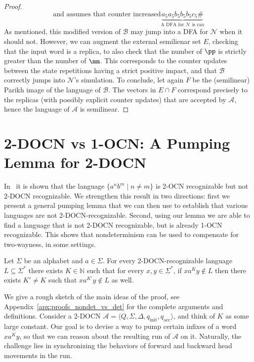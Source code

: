 \documentclass[USenglish]{lipics-v2021}
\newcommand{\tup}[1]{\langle #1 \rangle}
\newcommand{\initstate}{q_{\mathrm{init}}}
\newcommand{\accstate}{q_{\mathrm{acc}}}
\newcommand{\bbN}{\mathbb{N}}
\newcommand{\cA}{\mathcal{A}}
\newcommand{\cB}{\mathcal{B}}
\newcommand{\cN}{\mathcal{N}}
\begin{document}
\begin{proof}
\[{		\text{and assumes that counter increased}}
	\underbrace{a_5a_5b_5b_5b_5c_5 \#}_{\text{A DFA for $\cN$ is ran}}\]
	As mentioned, this modified version of \(\cB\) may jump into a DFA for \(\cN\)
	when it should not.  However, we can augment the external semilienar set \(E\), checking that the input word is a replica, to also check that %
	the number of \(\pp\) is strictly greater than the number of \(\mm\).  This
	corresponds to the counter updates between the state repetitions having a
	strict positive impact, and that \(\cB\) correctly jumps into \(\cN\)'s
	simulation.  
	To conclude, let again \(F\) be the (semilinear) Parikh image of
	the language of \(\cB\).  The vectors in \(E \cap F\) correspond precisely to the
	replicas (with possibly explicit counter updates) that are accepted by \(\cA\),
	hence the language of \(\cA\) is semilinear.
\end{proof}

\section{2-DOCN  vs 1-OCN: A Pumping Lemma for  2-DOCN}
\label{sec:nondet_vs_det}
In~\cite{chan1987two} it is shown that the language $\{a^nb^m\mid n\neq m\}$ is 2-OCN
recognizable but not 2-DOCN recognizable. We strengthen this result in two
directions: first we present a general pumping lemma that we can then use to
establish that various languages are not 2-DOCN-recognizable. Second, using our
lemma we are able to find a language that is not 2-DOCN recognizable, but is
already 1-OCN recognizable. This shows that nondeterminism can be used to
compensate for two-wayness, in some settings.
\begin{lemma}\label{lem:2DOCN_pump}
	Let $\Sigma$ be an alphabet and $a\in \Sigma$. For every 2-DOCN-recognizable language
	\(L\subseteq \Sigma^*\) there exists \(K \in \bbN\) such that for every $x,y\in \Sigma^*$, if \(xa^Ky \notin
	L\) then there exists $K'\neq K$ such that \(xa^{K'}y \notin L\) as well.
\end{lemma} 
We give a rough sketch of the main ideas of the proof, see Appendix~\ref{apx:proofs_nondet_vs_det} for the complete arguments and definitions.
%
Consider a 2-DOCN $\cA=\tup{Q,\Sigma,\Delta,\initstate,\accstate}$, and think of $K$ as some large constant.
Our goal is to devise a way to pump certain infixes of a word $xa^Ky$, so that we can reason about the resulting run of $\cA$ on it. 
Naturally, the challenge lies in synchronizing the behaviors of forward and backward head movements in the run.
\end{document}
